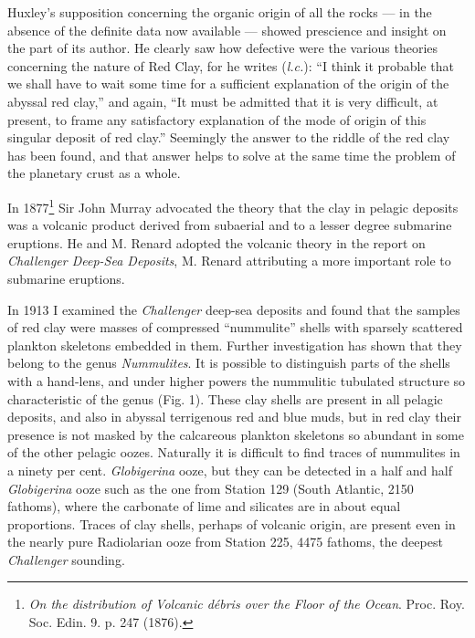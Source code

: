 \documentclass[a4paper, 12pt, oneside]{article}
\begin{document}
Huxley's supposition concerning the organic origin of all the rocks --- in the absence of the definite data now available --- showed prescience and insight on the part of its author. He clearly saw how defective were the various theories concerning the nature of Red Clay, for he writes (\emph{l.c.}): ``I think it probable that we shall have to wait some time for a sufficient explanation of the origin of the abyssal red clay,'' and again, ``It must be admitted that it is very difficult, at present, to frame any satisfactory explanation of the mode of origin of this singular deposit of red clay.'' Seemingly the answer to the riddle of the red clay has been found, and that answer helps to solve at the same time the problem of the planetary crust as a whole.

In 1877\footnote{\emph{On the distribution of Volcanic débris over the Floor of the Ocean}. Proc. Roy. Soc. Edin. 9. p. 247 (1876).} Sir John Murray advocated the theory that the clay in pelagic deposits was a volcanic product derived from subaerial and to a lesser degree submarine eruptions. He and M. Renard adopted the volcanic theory in the report on \emph{Challenger Deep-Sea Deposits}, M. Renard attributing a more important role to submarine eruptions.

In 1913 I examined the \emph{Challenger} deep-sea deposits and found that the samples of red clay were masses of compressed ``nummulite'' shells with sparsely scattered plankton skeletons embedded in them. Further investigation has shown that they belong to the genus \emph{Nummulites}. It is possible to distinguish parts of the shells with a hand-lens, and under higher powers the nummulitic tubulated structure so characteristic of the genus (Fig. 1). These clay shells are present in all pelagic deposits, and also in abyssal terrigenous red and blue muds, but in red clay their presence is not masked by the calcareous plankton skeletons so abundant in some of the other pelagic oozes. Naturally it is difficult to find traces of nummulites in a ninety per cent. \emph{Globigerina} ooze, but they can be detected in a half and half \emph{Globigerina} ooze such as the one from Station 129 (South Atlantic, 2150 fathoms), where the carbonate of lime and silicates are in about equal proportions. Traces of clay shells, perhaps of volcanic origin, are present even in the nearly pure Radiolarian ooze from Station 225, 4475 fathoms, the deepest \emph{Challenger} sounding.
\end{document}
